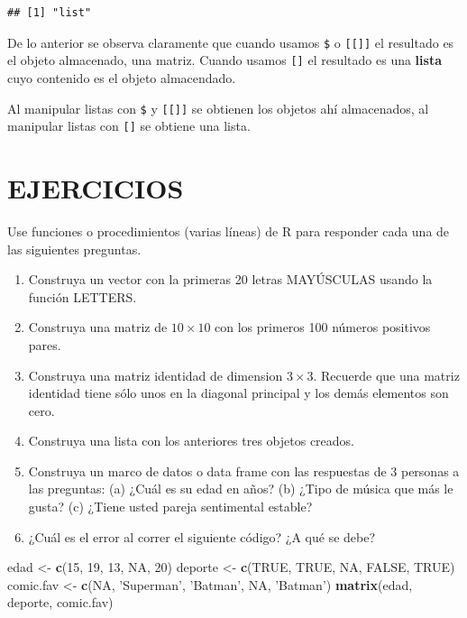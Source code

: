 \documentclass[10pt,]{krantz}
\makeatletter
\newenvironment{Shaded}{\begin{snugshade}}{\end{snugshade}}
\newcommand{\KeywordTok}[1]{\textcolor[rgb]{0.13,0.29,0.53}{\textbf{{#1}}}}
\newcommand{\DecValTok}[1]{\textcolor[rgb]{0.00,0.00,0.81}{{#1}}}
\newcommand{\StringTok}[1]{\textcolor[rgb]{0.31,0.60,0.02}{{#1}}}
\newcommand{\OtherTok}[1]{\textcolor[rgb]{0.56,0.35,0.01}{{#1}}}
\newcommand{\NormalTok}[1]{{#1}}
\let\proglang=\textsf
\newenvironment{kframe}{%
\medskip{}
\setlength{\fboxsep}{.8em}
 \def\at@end@of@kframe{}%
 \ifinner\ifhmode%
  \def\at@end@of@kframe{\end{minipage}}%
  \begin{minipage}{\columnwidth}%
 \fi\fi%
 \def\FrameCommand##1{\hskip\@totalleftmargin \hskip-\fboxsep
 \colorbox{shadecolor}{##1}\hskip-\fboxsep
     \hskip-\linewidth \hskip-\@totalleftmargin \hskip\columnwidth}%
 \MakeFramed {\advance\hsize-\width
   \@totalleftmargin\z@ \linewidth\hsize
   \@setminipage}}%
 {\par\unskip\endMakeFramed%
 \at@end@of@kframe}
\renewenvironment{Shaded}{\begin{kframe}}{\end{kframe}}
\let\BeginKnitrBlock\begin \let\EndKnitrBlock\end
\makeatother
\begin{document}
\begin{verbatim}
## [1] "list"
\end{verbatim}

De lo anterior se observa claramente que cuando usamos \texttt{\$} o
\texttt{{[}{[}{]}{]}} el resultado es el objeto almacenado, una matriz.
Cuando usamos \texttt{{[}{]}} el resultado es una \textbf{lista} cuyo
contenido es el objeto almacendado.

\BeginKnitrBlock{rmdwarning}
Al manipular listas con \texttt{\$} y \texttt{{[}{[}{]}{]}} se obtienen
los objetos ahí almacenados, al manipular listas con \texttt{{[}{]}} se
obtiene una lista.
\EndKnitrBlock{rmdwarning}

\section*{EJERCICIOS}\label{ejercicios}


Use funciones o procedimientos (varias líneas) de \proglang{R} para
responder cada una de las siguientes preguntas.

\begin{enumerate}
\def\labelenumi{\arabic{enumi}.}
\item
  Construya un vector con la primeras 20 letras MAYÚSCULAS usando la
  función LETTERS.
\item
  Construya una matriz de \(10 \times 10\) con los primeros 100 números
  positivos pares.
\item
  Construya una matriz identidad de dimension \(3 \times 3\). Recuerde
  que una matriz identidad tiene sólo unos en la diagonal principal y
  los demás elementos son cero.
\item
  Construya una lista con los anteriores tres objetos creados.
\item
  Construya un marco de datos o data frame con las respuestas de 3
  personas a las preguntas: (a) ¿Cuál es su edad en años? (b) ¿Tipo de
  música que más le gusta? (c) ¿Tiene usted pareja sentimental estable?
\item
  ¿Cuál es el error al correr el siguiente código? ¿A qué se debe?
\end{enumerate}

\begin{Shaded}
\begin{Highlighting}[]
\NormalTok{edad <-}\StringTok{ }\KeywordTok{c}\NormalTok{(}\DecValTok{15}\NormalTok{, }\DecValTok{19}\NormalTok{, }\DecValTok{13}\NormalTok{, }\OtherTok{NA}\NormalTok{, }\DecValTok{20}\NormalTok{)}
\NormalTok{deporte <-}\StringTok{ }\KeywordTok{c}\NormalTok{(}\OtherTok{TRUE}\NormalTok{, }\OtherTok{TRUE}\NormalTok{, }\OtherTok{NA}\NormalTok{, }\OtherTok{FALSE}\NormalTok{, }\OtherTok{TRUE}\NormalTok{)}
\NormalTok{comic.fav <-}\StringTok{ }\KeywordTok{c}\NormalTok{(}\OtherTok{NA}\NormalTok{, }\StringTok{'Superman'}\NormalTok{, }\StringTok{'Batman'}\NormalTok{, }\OtherTok{NA}\NormalTok{, }\StringTok{'Batman'}\NormalTok{)}
\KeywordTok{matrix}\NormalTok{(edad, deporte, comic.fav)}
\end{Highlighting}
\end{Shaded}
\end{document}
